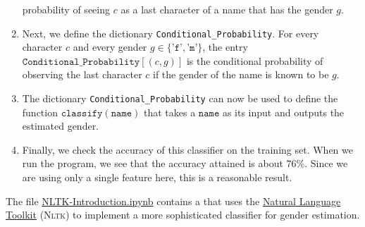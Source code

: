\begin{enumerate}
      probability of seeing $c$ as a last character of a name that has the gender $g$. 
\item Next, we define the dictionary \texttt{Conditional\_Probability}.  For every character $c$ and every
      gender $g \in \{\texttt{'f'}, \texttt{'m'}\}$, the entry $\texttt{Conditional\_Probability}[(c,g)]$ is the
      conditional probability of observing the last character $c$ if the gender of the name is known to be $g$. 
\item The dictionary \texttt{Conditional\_Probability} can now be used to define the function
      $\texttt{classify}(\texttt{name})$ that takes a $\texttt{name}$ as its input and outputs the estimated
      gender.
\item Finally, we check the accuracy of this classifier on the training set.  When we run the program, we see
      that the accuracy attained is about $76\%$.  Since we are using only a single feature here, this is a
      reasonable result.
\end{enumerate}
The file
\href{https://github.com/karlstroetmann/Artificial-Intelligence/blob/master/Python/NLTK-Introduction.ipynb}{NLTK-Introduction.ipynb}
contains a  that uses the \href{https://www.nltk.org}{Natural Language Toolkit}
(\textsc{Nltk}) to implement a more sophisticated classifier for gender estimation.

 
